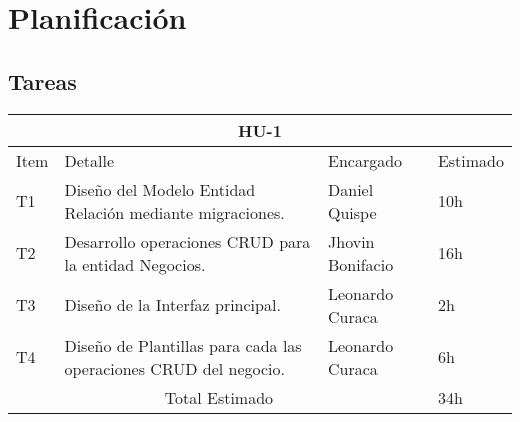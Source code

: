 \chapter{Planificación}
\section{Tareas}
\begin{table}[htbp]
	\begin{center}
		\begin{tabular}{| p{0.7cm} | p{10cm} | p{3.2cm} | p{1.8cm}|}
			\hline
			\multicolumn{4}{|c|}{HU-1}\\
			\hline
			Item & Detalle & Encargado & Estimado \\
			\hline
			T1 & Diseño del Modelo Entidad Relación mediante migraciones. & Daniel Quispe & 10h \\
			\hline
			T2 & Desarrollo operaciones CRUD para la entidad Negocios. & Jhovin Bonifacio & 16h \\
			\hline
			T3 & Diseño de la Interfaz principal. & Leonardo Curaca & 2h \\
			\hline
			T4 & Diseño de Plantillas para cada las operaciones CRUD del negocio. & Leonardo Curaca & 6h \\
			\hline
			\multicolumn{3}{|c|}{Total Estimado} & 34h\\
			\hline
		\end{tabular}
	\end{center}
\end{table}
